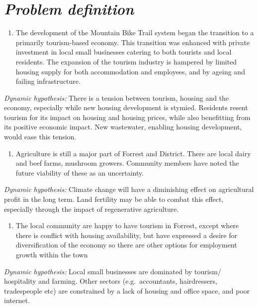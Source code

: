 \documentclass[
  11pt,
]{book}
\providecommand{\tightlist}{%
  \setlength{\itemsep}{0pt}\setlength{\parskip}{0pt}}
\begin{document}
\hypertarget{problem-definition-3}{%
\section{\texorpdfstring{\emph{Problem definition}}{Problem definition}}\label{problem-definition-3}}

\begin{enumerate}
\def\labelenumi{\arabic{enumi}.}
\tightlist
\item
  The development of the Mountain Bike Trail system began the transition to a primarily tourism-based economy. This transition was enhanced with private investment in local small businesses catering to both tourists and local residents. The expansion of the tourism industry is hampered by limited housing supply for both accommodation and employees, and by ageing and failing infrastructure.
\end{enumerate}

\emph{Dynamic hypothesis:}
There is a tension between tourism, housing and the economy, especially while new housing development is stymied. Residents resent tourism for its impact on housing and housing prices, while also benefitting from its positive economic impact. New wastewater, enabling housing development, would ease this tension.

\begin{enumerate}
\def\labelenumi{\arabic{enumi}.}
\setcounter{enumi}{1}
\tightlist
\item
  Agriculture is still a major part of Forrest and District. There are local dairy and beef farms, mushroom growers. Community members have noted the future viability of these as an uncertainty.
\end{enumerate}

\emph{Dynamic hypothesis:}
Climate change will have a diminishing effect on agricultural profit in the long term. Land fertility may be able to combat this effect, especially through the impact of regenerative agriculture.

\begin{enumerate}
\def\labelenumi{\arabic{enumi}.}
\setcounter{enumi}{2}
\tightlist
\item
  The local community are happy to have tourism in Forrest, except where there is conflict with housing availability, but have expressed a desire for diversification of the economy so there are other options for employment growth within the town
\end{enumerate}

\emph{Dynamic hypothesis:}
Local small businesses are dominated by tourism/ hospitality and farming. Other sectors (e.g.~accountants, hairdressers, tradespeople etc) are constrained by a lack of housing and office space, and poor internet.
\end{document}
